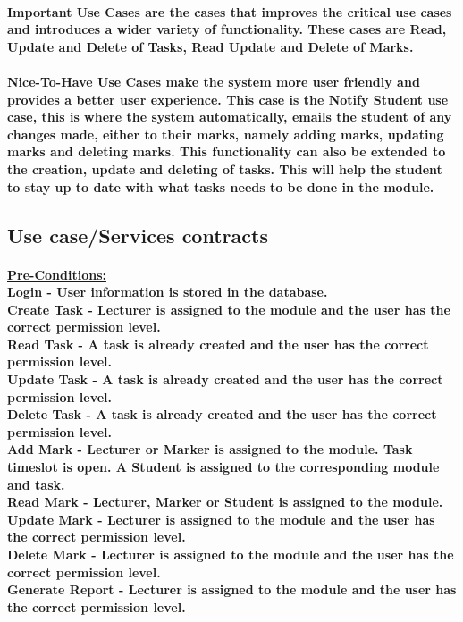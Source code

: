 \documentclass[12pt]{article}
\begin{document}
 \paragraph*{Important Use Cases are the cases that improves the critical use cases and introduces a wider variety of functionality. These cases are Read, Update and Delete of Tasks, Read Update  and Delete of Marks.}
 \paragraph*{Nice-To-Have Use Cases make the system more user friendly and provides a better user experience. This case is the Notify Student use case, this is where the system automatically, emails the student of any changes made, either to their marks, namely adding marks, updating marks and deleting marks. This functionality can also be extended to the creation, update and deleting of tasks. This will help the student to stay up to date with what tasks needs to be done in the module.}
 \subsection{Use case/Services contracts}
 \paragraph*{\underline{Pre-Conditions: }\\ \textbf{Login} - User information is stored in the database.
 \\ \textbf{Create Task} - Lecturer is assigned to the module and the user has the correct permission level.
 \\ \textbf{Read Task} - A task is already created and the user has the correct permission level.
 \\ \textbf{Update Task} - A task is already created and the user has the correct permission level.
 \\ \textbf{Delete Task} - A task is already created and the user has the correct permission level.
 \\ \textbf{Add Mark} - Lecturer or Marker is assigned to the module. Task timeslot is open. A Student is assigned to the corresponding module and task.
 \\ \textbf{Read Mark} - Lecturer, Marker or Student is assigned to the module.
 \\ \textbf{Update Mark} - Lecturer is assigned to the module and the user has the correct permission level.
 \\ \textbf{Delete Mark} - Lecturer is assigned to the module and the user has the correct permission level.
 \\ \textbf{Generate Report} - Lecturer is assigned to the module and the user has the correct permission level.}
\end{document}
